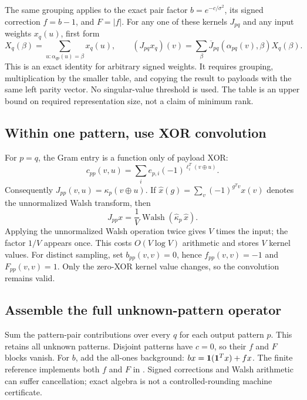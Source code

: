 \documentclass[10pt,a4paper]{article}
\begin{document}
The same grouping applies to the exact pair factor $b=e^{-c/\sigma^2}$, its signed correction $f=b-1$,
and $F=|f|$. For any one of these kernels $J_{pq}$ and any input weights $x_q(u)$, first form
\[
 X_q(\beta)=\sum_{u:\alpha_{qp}(u)=\beta}x_q(u),
 \qquad
 (J_{pq}x_q)(v)=\sum_\beta\overline J_{pq}(\alpha_{pq}(v),\beta)X_q(\beta).
\]
This is an exact identity for arbitrary signed weights. It requires grouping, multiplication by the smaller
table, and copying the result to payloads with the same left parity vector. No singular-value threshold is used.
The table is an upper bound on required representation size, not a claim of minimum rank.

\subsection{Within one pattern, use XOR convolution}
For $p=q$, the Gram entry is a function only of payload XOR:
\[
 c_{pp}(v,u)=\sum_i e_{p,i}(-1)^{\ell_i^T(v\oplus u)}.
\]
Consequently $J_{pp}(v,u)=\kappa_p(v\oplus u)$. If
$\widehat x(g)=\sum_v(-1)^{g^Tv}x(v)$ denotes the unnormalized Walsh transform, then
\begin{equation}
 J_{pp}x=\frac1V\operatorname{Walsh}(\widehat\kappa_p\,\widehat x).
 \label{eq:pair-walsh-contraction}
\end{equation}
Applying the unnormalized Walsh operation twice gives $V$ times the input; the factor $1/V$ appears once.
This costs $O(V\log V)$ arithmetic and stores $V$ kernel values.
For distinct sampling, set $b_{pp}(v,v)=0$, hence $f_{pp}(v,v)=-1$ and $F_{pp}(v,v)=1$.
Only the zero-XOR kernel value changes, so the convolution remains valid.

\clearpage
\subsection{Assemble the full unknown-pattern operator}
Sum the pattern-pair contributions over every $q$ for each output pattern $p$. This retains all unknown
patterns. Disjoint patterns have $c=0$, so their $f$ and $F$ blocks vanish. For $b$, add the all-ones
background: $bx=\mathbf{1}(\mathbf{1}^Tx)+fx$.
The finite reference implements both $f$ and $F$ in .
Signed corrections and Walsh arithmetic can suffer cancellation; exact algebra is not a controlled-rounding
machine certificate.
\end{document}

